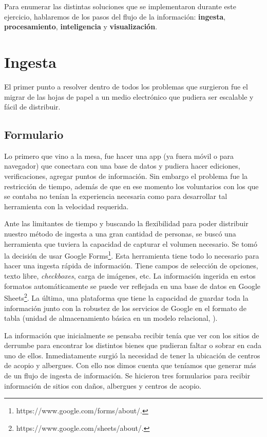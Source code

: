 \documentclass[12pt,spanish,oneside,breaklinks]{book}
\begin{document}
Para enumerar las distintas soluciones que se implementaron durante este ejercicio, hablaremos de los pasos del flujo de la información: \textbf{ingesta}, \textbf{procesamiento}, \textbf{inteligencia} y \textbf{visualización}.

\section{Ingesta}
\label{sec:orgfa5099b}

El primer punto a resolver dentro de todos los problemas que surgieron fue el migrar de las hojas de papel a un medio electrónico que pudiera ser escalable y fácil de distribuir.

\subsection{Formulario}
\label{sec:orgabe6006}

Lo primero que vino a la mesa, fue hacer una app (ya fuera móvil o para navegador) que conectara con una base de datos y pudiera hacer ediciones, verificaciones, agregar puntos de información. Sin embargo el problema fue la restricción de tiempo, además de que en ese momento los voluntarios con los que se contaba no tenían la experiencia necesaria como para desarrollar tal herramienta con la velocidad requerida.

Ante las limitantes de tiempo y buscando la flexibilidad para poder distribuir nuestro método de ingesta a una gran cantidad de personas, se buscó una herramienta que tuviera la capacidad de capturar el volumen necesario. Se tomó la decisión de usar Google Forms\footnote{https://www.google.com/forms/about/.}. Esta herramienta tiene todo lo necesario para hacer una ingesta rápida de información. Tiene campos de selección de opciones, texto libre, \emph{checkboxes}, carga de imágenes, etc. La información ingerida en estos formatos automáticamente se puede ver reflejada en una base de datos en Google Sheets\footnote{https://www.google.com/sheets/about/.}. La última, una plataforma que tiene la capacidad de guardar toda la información junto con la robustez de los servicios de Google en el formato de tabla (unidad de almacenamiento básica en un modelo relacional, \cite{codd}).

La información que inicialmente se pensaba recibir tenía que ver con los sitios de derrumbe para encontrar los distintos bienes que pudieran faltar o sobrar en cada uno de ellos. Inmediatamente surgió la necesidad de tener la ubicación de centros de acopio y albergues. Con ello nos dimos cuenta que teníamos que generar más de un flujo de ingesta de información. Se hicieron tres formularios para recibir información de sitios con daños, albergues y centros de acopio.
\end{document}

